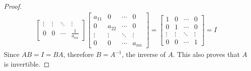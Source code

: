 \documentclass{article}
\begin{document}
\begin{enumerate}
\begin{proof}
\begin{align*}
\begin{bmatrix}
                       \vdots           & \vdots           & \ddots & \vdots           \\
                       0                & 0                & \cdots & \frac{1}{a_{nn}}
                   \end{bmatrix}\begin{bmatrix}
                                    a_{11} & 0      & \cdots & 0      \\
                                    0      & a_{22} & \cdots & 0      \\
                                    \vdots & \vdots & \ddots & \vdots \\
                                    0      & 0      & \cdots & a_{nn}
                                \end{bmatrix} = \begin{bmatrix}
                                                    1      & 0      & \cdots & 0      \\
                                                    0      & 1      & \cdots & 0      \\
                                                    \vdots & \vdots & \ddots & \vdots \\
                                                    0      & 0      & \cdots & 1
                                                \end{bmatrix} = I
        \end{align*}
        Since $AB = I = BA$, therefore $B = A^{-1}$, the inverse of $A$. This also proves that $A$ is invertible.
    \end{proof}
\end{enumerate}
\end{document}
